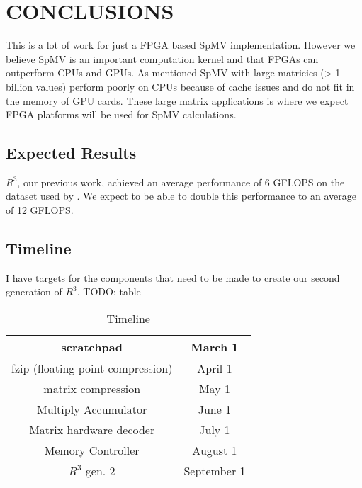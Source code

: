 \chapter{CONCLUSIONS}
This is a lot of work for just a FPGA based SpMV implementation. However we believe SpMV is an important computation kernel and that FPGAs can outperform CPUs and GPUs. As mentioned SpMV with large matricies (> 1 billion values) perform poorly on CPUs because of cache issues and do not fit in the memory of GPU cards. These large matrix applications is where we expect FPGA platforms will be used for SpMV calculations.
\section{Expected Results}
\label{chapter:expected}
$R^3$, our previous work, achieved an average performance of 6 GFLOPS on the dataset used by \cite{}. We expect to be able to double this performance to an average of 12 GFLOPS.

\section{Timeline}
I have targets for the components that need to be made to create our second generation of $R^3$. TODO: table

\begin{table*}
\caption{Timeline}
\label{tbl:timeline}
\centering
\begin{tabular}{|c|c|}
\hline
scratchpad & March 1 \\
\hline
fzip (floating point compression) & April 1 \\
\hline
matrix compression & May 1 \\
\hline
Multiply Accumulator & June 1\\
\hline
Matrix hardware decoder & July 1\\
\hline
Memory Controller & August 1 \\
\hline
$R^3$ gen. 2 & September 1 \\
\hline
\end{tabular}
\end{table*}
